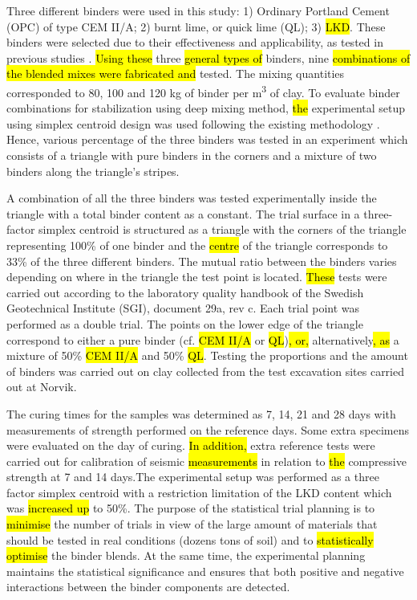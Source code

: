 \documentclass[final,3p,times,onecolumn,authoryear]{elsarticle}
\begin{document}
Three different binders were used in this study: 1) Ordinary Portland Cement (OPC) of type CEM II/A; 2) burnt lime, or quick lime (QL); 3) \hl{LKD}. These binders were selected due to their effectiveness and applicability, as tested in previous studies \citep{LindhLemenkova2022CEE}. \hl{Using these} three \hl{general types of }binders, nine \hl{combinations of the blended mixes were fabricated and} tested. The mixing quantities corresponded to 80, 100 and 120 kg of binder per m\textsuperscript{3} of clay. To evaluate binder combinations for stabilization using deep mixing method, \hl{the} experimental setup using simplex centroid design was used following the existing methodology \citep{electronics11223726}. Hence, various percentage of the three binders was tested in an experiment which consists of a triangle with pure binders in the corners and a mixture of two binders along the triangle's stripes. 

A combination of all the three binders was tested experimentally inside the triangle with a total binder content as a constant. The trial surface in a three-factor simplex centroid is structured as a triangle with the corners of the triangle representing 100\% of one binder and the \hl{centre} of the triangle corresponds to 33\% of the three different binders. The mutual ratio between the binders varies depending on where in the triangle the test point is located. \hl{These} tests were carried out according to the laboratory quality handbook of the Swedish Geotechnical Institute (SGI), document 29a, rev c. Each trial point was performed as a double trial. The points on the lower edge of the triangle correspond to either a pure binder\hl{ }(cf. \hl{CEM II/A} or \hl{QL})\hl{, or, }alternatively\hl{, as} a mixture of 50\% \hl{CEM II/A} and 50\% \hl{QL}. Testing the proportions and the amount of binders was carried out on clay collected from the test excavation sites carried out at Norvik. 

The curing times for the samples was determined as 7, 14, 21 and 28 days with measurements of strength performed on the reference days. Some extra specimens were evaluated on the  day of curing. \hl{In addition, }extra reference tests were carried out \hl{ }for calibration of seismic \hl{measurements} in relation to \hl{the }compressive strength at 7 and 14 days.The experimental setup was performed as a three\hl{ }factor simplex centroid with a restriction limitation of the LKD content which was \hl{increased up} to 50\%. The purpose of the statistical trial planning is to \hl{minimise} the number of trials in view of the large amount of materials that should be tested in real conditions (dozens tons of soil) and to \hl{statistically optimise} the binder blends. At the same time, the experimental planning maintains the statistical significance and ensures that both positive and negative interactions between the binder components are detected. 
\end{document}

